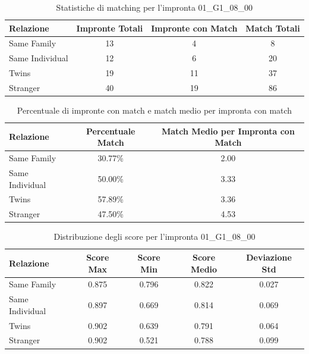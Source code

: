 \begin{table}[htbp]
\centering
\caption{Statistiche di matching per l'impronta 01\_G1\_08\_00}
\label{tab:results_01_G1_08_00}
\begin{tabular}{|l|c|c|c|}
\hline
\textbf{Relazione} & \textbf{Impronte Totali} & \textbf{Impronte con Match} & \textbf{Match Totali} \\
\hline
Same Family & 13 & 4 & 8 \\
\hline
Same Individual & 12 & 6 & 20 \\
\hline
Twins & 19 & 11 & 37 \\
\hline
Stranger & 40 & 19 & 86 \\
\hline
\end{tabular}
\end{table}


\begin{table}[htbp]
\centering
\caption{Percentuale di impronte con match e match medio per impronta con match}
\label{tab:match_percentage_01_G1_08_00}
\begin{tabular}{|l|c|c|}
\hline
\textbf{Relazione} & \textbf{Percentuale Match} & \textbf{Match Medio per Impronta con Match} \\
\hline
Same Family & 30.77\% & 2.00 \\
\hline
Same Individual & 50.00\% & 3.33 \\
\hline
Twins & 57.89\% & 3.36 \\
\hline
Stranger & 47.50\% & 4.53 \\
\hline
\end{tabular}
\end{table}


\begin{table}[htbp]
\centering
\caption{Distribuzione degli score per l'impronta 01\_G1\_08\_00}
\label{tab:scores_01_G1_08_00}
\begin{tabular}{|l|c|c|c|c|}
\hline
\textbf{Relazione} & \textbf{Score Max} & \textbf{Score Min} & \textbf{Score Medio} & \textbf{Deviazione Std} \\
\hline
Same Family & 0.875 & 0.796 & 0.822 & 0.027 \\
\hline
Same Individual & 0.897 & 0.669 & 0.814 & 0.069 \\
\hline
Twins & 0.902 & 0.639 & 0.791 & 0.064 \\
\hline
Stranger & 0.902 & 0.521 & 0.788 & 0.099 \\
\hline
\end{tabular}
\end{table}

